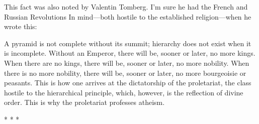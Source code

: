 This fact was also noted by Valentin Tomberg. I'm sure he had the French and Russian Revolutions In mind---both hostile to the established religion---when he wrote this:

\begin{quotex}
A pyramid is not complete without its summit; hierarchy does not exist when it is incomplete. Without an Emperor, there will be, sooner or later, no more kings. When there are no kings, there will be, sooner or later, no more nobility. When there is no more nobility, there will be, sooner or later, no more bourgeoisie or peasants. This is how one arrives at the dictatorship of the proletariat, the class hostile to the hierarchical principle, which, however, is the reflection of divine order. This is why the proletariat professes atheism.
\end{quotex}



\begin{center}* * *\end{center}

